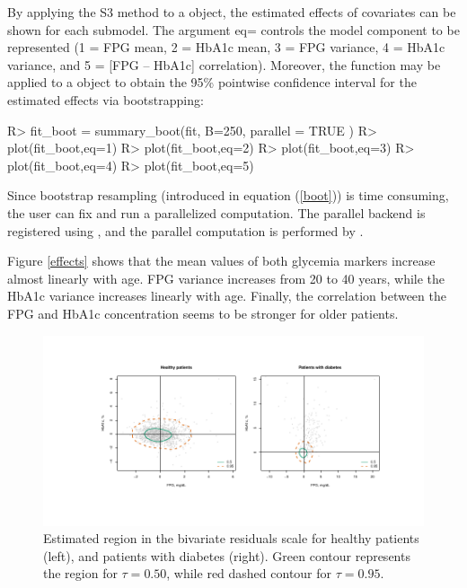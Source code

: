 By applying the S3 method  to a  object, the estimated effects of covariates can be shown for each submodel. The argument eq= controls the model component to be represented (1 = FPG mean, 2 = HbA1c mean, 3 = FPG variance, 4 = HbA1c variance, and 5 = [FPG – HbA1c] correlation). Moreover, the function  may be applied to a  object to obtain the 95\% pointwise confidence interval for the estimated effects via bootstrapping:


\begin{example}
R> fit_boot = summary_boot(fit, B=250, parallel = TRUE )
R> plot(fit_boot,eq=1)
R> plot(fit_boot,eq=2)
R> plot(fit_boot,eq=3)
R> plot(fit_boot,eq=4)
R> plot(fit_boot,eq=5) 
\end{example}

Since bootstrap resampling (introduced in equation (\ref{boot})) is time consuming, the user can fix  and run a parallelized computation. The parallel backend is registered using  \citep{doparallel}, and the parallel computation is performed by  \citep{foreach}.




Figure \ref{effects} shows that the mean values of both glycemia markers increase almost linearly with age. FPG variance increases from 20 to 40 years, while the HbA1c variance increases linearly with age. Finally, the correlation between the FPG and HbA1c concentration seems to be stronger for older patients.


\begin{figure}[!htb]
	\centering
	\includegraphics[width = \textwidth]{Fig3.pdf}
	\caption{Estimated region in the bivariate residuals scale for healthy patients (left), and patients with diabetes (right). Green contour represents the region for $\tau = 0.50$, while red dashed contour for $\tau = 0.95$.}
	\label{bivregion}
\end{figure}

